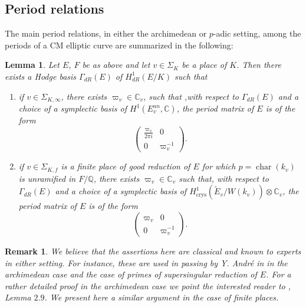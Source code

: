 \documentclass[12pt,twoside,a4paper]{article}
\theoremstyle{plain}%
\newtheorem{lemma}[theorem]{Lemma}
\newtheorem{remark}[theorem]{Remark}
\DeclareMathOperator{\chara}{char}
\DeclareMathOperator{\crys}{crys}
\newcommand{\C}{\mathbb{C}}
\newcommand{\Q}{\mathbb{Q}}
\begin{document}
\subsection{Period relations}\label{section:cmperiods}

The main period relations, in either the archimedean or $p$-adic setting, among the periods of a CM elliptic curve are summarized in the following:

\begin{lemma}\label{lemmacmperiods} Let $E$, $F$ be as above and let $v\in \Sigma_{K}$ be a place of $K$. Then there exists a Hodge basis $\Gamma_{dR}(E)$ of $H^1_{dR}(E/K)$ such that 
	\begin{enumerate}
		\item if $v\in \Sigma_{K,\infty}$, there exists $\varpi_v\in \C_v$, such that ,with respect to $\Gamma_{dR}(E)$ and a choice of a symplectic basis of $H^1(E_v^{an}, \C)$, the period matrix of $E$ is of the form \begin{equation}\label{eq:cmperarch}
			\begin{pmatrix}\frac{\varpi_v}{2\pi i}&0\\
				0& \varpi_v^{-1}
			\end{pmatrix}.\end{equation}
		
		\item if $v\in \Sigma_{K,f}$ is a finite place of good reduction of $E$ for which $p=\chara(k_v)$ is unramified in $F/\Q$, there exists $\varpi_v\in \C_v$ such that, with respect to $\Gamma_{dR}(E)$ and a choice of a symplectic basis of $H^1_{\crys}(\tilde{E}_v/W(k_v))\otimes \C_v$, the period matrix of $E$ is of the form \begin{equation}\label{eq:cmpernonarch}
			\begin{pmatrix}\varpi_v&0\\
				0& \varpi_v^{-1}
			\end{pmatrix}.
		\end{equation}
	\end{enumerate}
\end{lemma}
\begin{remark}
	We believe that the assertions here are classical and known to experts in either setting. For instance, these are used in passing by Y. Andr\'e in \cite{andremots} in the archimedean case and the case of primes of supersingular reduction of $E$. For a rather detailed proof in the archimedean case we point the interested reader to \cite{papaseffbrsieg}, Lemma $2.9$. We present here a similar argument in the case of finite places.
\end{remark}
\end{document}
